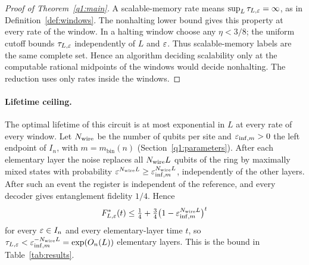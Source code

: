 \begin{proof}[Proof of Theorem~\ref{q1:main}]
A scalable-memory rate means \(\sup_L\tau_{L,\varepsilon}=\infty\), as in Definition~\ref{def:windows}. The nonhalting lower bound gives this property at every rate of the window. In a halting window choose any \(\eta<3/8\); the uniform cutoff bounds \(\tau_{L,\varepsilon}\) independently of \(L\) and \(\varepsilon\). Thus scalable-memory labels are the same complete set. Hence an algorithm deciding scalability only at the computable rational midpoints of the windows would decide nonhalting. The reduction uses only rates inside the windows.
\end{proof}

\paragraph{Lifetime ceiling.} The optimal lifetime of this circuit is at most exponential in \(L\) at every rate of every window. Let \(N_{\rm wire}\) be the number of qubits per site and \(\varepsilon_{\mathrm{inf},m}>0\) the left endpoint of \(I_n\), with \(m=m_{\mathrm{bin}}(n)\) (Section~\ref{q1:parameters}). After each elementary layer the noise replaces all \(N_{\rm wire}L\) qubits of the ring by maximally mixed states with probability \(\varepsilon^{N_{\rm wire}L}\ge \varepsilon_{\mathrm{inf},m}^{N_{\rm wire}L}\), independently of the other layers. After such an event the register is independent of the reference, and every decoder gives entanglement fidelity \(1/4\). Hence
\[
 F^*_{L,\varepsilon}(t)\le\tfrac14+\tfrac34\bigl(1-\varepsilon_{\mathrm{inf},m}^{N_{\rm wire}L}\bigr)^{t}
\]
for every \(\varepsilon\in I_n\) and every elementary-layer time \(t\), so \(\tau_{L,\varepsilon}<\varepsilon_{\mathrm{inf},m}^{-N_{\rm wire}L}=\exp(O_n(L))\) elementary layers. This is the bound in Table~\ref{tab:results}.

